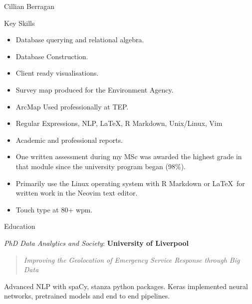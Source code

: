\documentclass{scrartcl}
\begin{document}
\begin{cv}{Cillian Berragan}
\begin{cvlist}{Key Skills}
\begin{itemize}
\end{itemize}

\vspace{5mm}
\item[\textbf{SQL:}]\begin{itemize}\item Database querying and relational algebra.
\item Database Construction.
\end{itemize}

\vspace{5mm}
\item[\textbf{QGIS \& ArcGIS:}]\begin{itemize}\item Client ready visualisations.
\item Survey map produced for the Environment Agency.
\item ArcMap Used professionally at TEP.
\vspace{5mm}
\item[\textbf{Additional Skills}:] Regular Expressions, NLP, \LaTeX, R Markdown, Unix/Linux, Vim 
\end{itemize}

\vspace{5mm}
\item[\textbf{Written work:}]\begin{itemize}\item Academic and professional reports.
\item One written assessment during my MSc was awarded the highest grade in that module since the university program began (98\%).
\item Primarily use the Linux operating system with R Markdown or \LaTeX\ for written work in the Neovim text editor.
\item Touch type at 80+ wpm.
\end{itemize}
\end{cvlist}

\newpage
\begin{cvlist}{Education}

\item[2019 - present] \normalsize\textit{PhD Data Analytics and Society}: \textbf{University of Liverpool}

    \begin{quote}
        \small \textit{Improving the Geolocation of Emergency Service Response through Big Data}
    \end{quote}

    \small Advanced NLP with spaCy, stanza python packages. Keras implemented neural networks, pretrained models and end to end pipelines.


\end{cvlist}
\end{cv}
\end{document}
